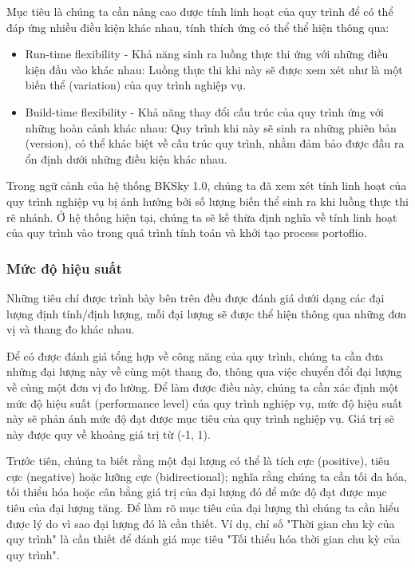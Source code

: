 Mục tiêu là chúng ta cần nâng cao được tính linh hoạt của quy trình để có thể
đáp ứng nhiều điều kiện khác nhau, tính thích ứng có thể thể hiện thông qua:

\begin{itemize}
    \item Run-time flexibility - Khả năng sinh ra luồng thực thi ứng với những điều kiện
          đầu vào khác nhau: Luồng thực thi khi này sẽ được xem xét như là một biến thể
          (variation) của quy trình nghiệp vụ.

    \item Build-time flexibility - Khả năng thay đổi cấu trúc của quy trình ứng với những
          hoàn cảnh khác nhau: Quy trình khi này sẽ sinh ra những phiên bản (version), có
          thể khác biệt về cấu trúc quy trình, nhằm đảm bảo được đầu ra ổn định dưới
          những điều kiện khác nhau.
\end{itemize}

Trong ngữ cảnh của hệ thống BKSky 1.0, chúng ta đã xem xét tính linh hoạt của
quy trình nghiệp vụ bị ảnh hưởng bởi số lượng biến thể sinh ra khi luồng thực
thi rẽ nhánh. Ở hệ thống hiện tại, chúng ta sẽ kế thừa định nghĩa về tính linh hoạt của quy trình vào trong quá trình tính toán và khởi tạo process portoflio.

\subsubsection{Mức độ hiệu suất}

Những tiêu chí được trình bày bên trên đều được đánh giá dưới dạng các đại lượng định tính/định lượng, mỗi đại lượng sẽ được thể hiện thông qua những đơn vị và thang đo khác nhau.

Để có được đánh giá tổng hợp về công năng của quy trình, chúng ta cần đưa những đại lượng này về cùng một thang đo, thông qua việc chuyển đổi đại lượng về cùng một đơn vị đo lường. Để làm được điều này, chúng ta cần xác định một mức độ hiệu suất (performance level) của quy trình nghiệp vụ, mức độ hiệu suất này sẽ phản ánh mức độ đạt được mục tiêu của quy trình nghiệp vụ. Giá trị sẽ này được quy về khoảng giá trị từ (-1, 1).

Trước tiên, chúng ta biết rằng một đại lượng có thể là tích cực (positive), tiêu cực (negative) hoặc lưỡng cực (bidirectional); nghĩa rằng chúng ta cần tối đa hóa, tối thiểu hóa hoặc cân bằng giá trị của đại lượng đó để mức độ đạt được mục tiêu của đại lượng tăng. Để làm rõ mục tiêu của đại lượng thì chúng ta cần hiểu được lý do vì sao đại lượng đó là cần thiết. Ví dụ, chỉ số "Thời gian chu kỳ của quy trình" là cần thiết để đánh giá mục tiêu "Tối thiểu hóa thời gian chu kỳ của quy trình".

